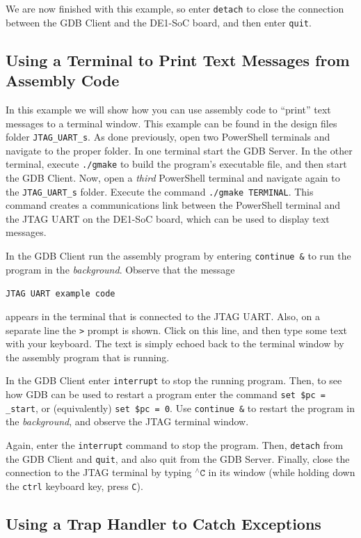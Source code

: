 \documentclass[11pt, twoside, pdftex]{article}
\begin{document}
We are now finished with this example, so enter \texttt{detach} to close the connection between 
the GDB Client and the DE1-SoC board, and then enter \texttt{quit}.

\subsection{Using a Terminal to Print Text Messages from Assembly Code}

In this example we will show how you can use assembly code to ``print'' text messages 
to a terminal window.  This example can be found in the design files folder 
\texttt{JTAG\_UART\_s}. As done previously, open two PowerShell terminals and navigate to
the proper folder. In one terminal
start the GDB Server. In the other terminal, execute \texttt{./gmake} to build the program's
executable file, and then start the GDB Client. Now, open a {\it third} PowerShell
terminal and navigate again to the \texttt{JTAG\_UART\_s} folder. Execute the command 
\texttt{./gmake TERMINAL}. This command creates a communications link between the PowerShell
terminal and the JTAG UART on the DE1-SoC board, which can be used to display text
messages. 

In the GDB Client run the assembly program by entering \texttt{continue \&} to run the
program in the {\it background}. Observe that the message 

\texttt{JTAG UART example code}

appears in the terminal that is connected to the
JTAG UART. Also, on a separate line the \texttt{>} prompt is shown. Click on this line,
and then type some text with your keyboard. The text is simply echoed back to the terminal
window by the assembly program that is running. 

In the GDB Client enter \texttt{interrupt} to stop the running program. Then, to see how GDB can
be used to restart a program enter the command \texttt{set \$pc = \_start}, or
(equivalently) \texttt{set \$pc = 0}. Use \texttt{continue \&} to restart the program in 
the {\it background}, and observe the JTAG terminal window. 

Again, enter the \texttt{interrupt} command to stop the program. Then, \texttt{detach} 
from the GDB Client and \texttt{quit}, and also quit from the GDB Server. Finally, close 
the connection to the JTAG terminal by typing $^{\wedge}\texttt{C}$ in its window
(while holding down the \texttt{ctrl} keyboard key, press \texttt{C}).

\subsection{Using a Trap Handler to Catch Exceptions}
\end{document}
